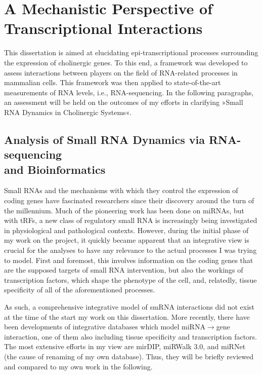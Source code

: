 \section[A Mechanistic Perspective of Transcriptional Interactions]{A Mechanistic Perspective of \\Transcriptional Interactions}

This dissertation is aimed at elucidating epi-transcriptional processes surrounding the expression of cholinergic genes. To this end, a framework was developed to assess interactions between players on the field of RNA-related processes in mammalian cells. This framework was then applied to state-of-the-art measurements of RNA levels, i.e., RNA-sequencing. In the following paragraphs, an assessment will be held on the outcomes of my efforts in clarifying »Small RNA Dynamics in Cholinergic Systems«.

\subsection{Analysis of Small RNA Dynamics via RNA-sequencing \\and Bioinformatics}
Small RNAs and the mechanisms with which they control the expression of coding genes have fascinated researchers since their discovery around the turn of the millennium. Much of the pioneering work has been done on miRNAs, but with tRFs, a new class of regulatory small RNA is increasingly being investigated in physiological and pathological contexts. However, during the initial phase of my work on the project, it quickly became apparent that an integrative view is crucial for the analyses to have any relevance to the actual processes I was trying to model. First and foremost, this involves information on the coding genes that are the supposed targets of small RNA intervention, but also the workings of transcription factors, which shape the phenotype of the cell, and, relatedly, tissue specificity of all of the aforementioned processes.

As such, a comprehensive integrative model of smRNA interactions did not exist at the time of the start my work on this dissertation. More recently, there have been developments of integrative databases which model miRNA$\to$gene interaction, one of them also including tissue specificity and transcription factors. The most extensive efforts in my view are mirDIP, miRWalk 3.0, and miRNet (the cause of renaming of my own database). Thus, they will be briefly reviewed and compared to my own work in the following.

